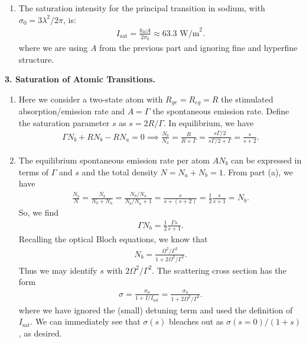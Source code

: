 \documentclass{article}
\theoremstyle{definition}
\newcommand{\f}[2]{\frac{#1}{#2}}
\begin{document}
\begin{enumerate}[label=(\alph*)]
	\item The saturation intensity for the principal transition in sodium, with $\sigma_0 = 3\lambda^2/2\pi$, is:
	\begin{align*}
	I_{\text{sat}} = \f{\hbar \omega A}{2\sigma_0}  \approx 63.3 \text{ W/m}^2.
	\end{align*}
	where we are using $A$ from the previous part and ignoring fine and hyperfine structure. 
	
\end{enumerate}


\textbf{3. Saturation of Atomic Transitions.}

\begin{enumerate}[label=(\alph*)]
	\item Here we consider a two-state atom with $R_{ge} = R_{eg} = R$ the stimulated absorption/emission rate and $A = \Gamma$ the spontaneous emission rate. Define the saturation parameter $s$ as $s = 2R/\Gamma$. In equilibrium, we have
	\begin{align*}
	\Gamma N_b + R N_b   - R N_a  = 0 \implies \f{N_b}{N_a} = \f{R}{R+\Gamma} = \f{s\Gamma/2}{s\Gamma/2 + \Gamma} =  \f{s}{s+2}.
	\end{align*}
	
	\item The equilibrium spontaneous emission rate per atom $A N_b$ can be expressed in terms of $\Gamma$ and $s$ and the total density $N = N_a + N_b = 1$. From part (a), we have 
	\begin{align*}
	\f{N_b}{N} = \f{N_b}{N_b + N_a} = \f{N_b/N_a}{N_b/N_a + 1} = \f{s}{s + (s+2)} = \f{1}{2} \f{s}{s+1} = N_b.
	\end{align*}
	So, we find 
	\begin{align*}
	\Gamma N_b = \f{1}{2} \f{\Gamma s}{s+1}.
	\end{align*}
	Recalling the optical Bloch equations, we know that
	\begin{align*}
	N_b = \f{\Omega^2/\Gamma^2}{1 +2\Omega^2/\Gamma^2}. 
	\end{align*}
	Thus we may identify $s$ with $2\Omega^2/\Gamma^2$. The scattering cross section has the form 
	\begin{align*}
	\sigma = \f{\sigma_0}{1 + I/I_\text{sat}} = \f{\sigma_0}{1 + 2\Omega^2/\Gamma^2}.
	\end{align*}
	where we have ignored the (small) detuning term and used the definition of $I_\text{sat}$. We can immediately see that $\sigma(s)$ bleaches out as $\sigma(s=0)/(1+s)$, as desired. 
	

\end{enumerate}
\end{document}
